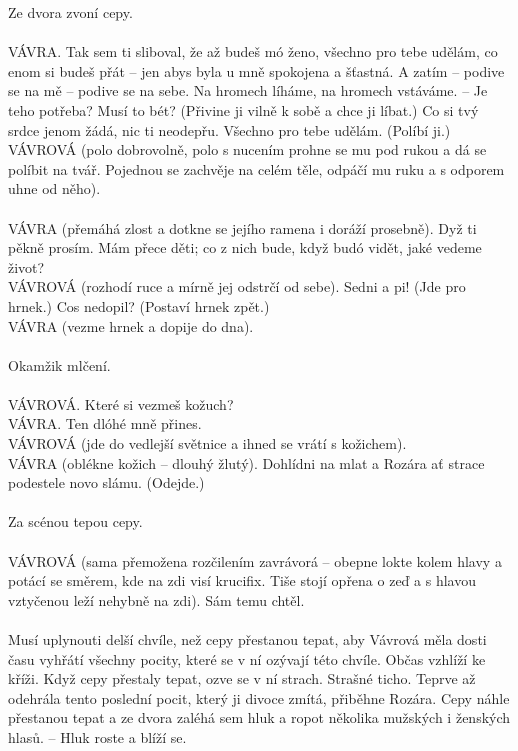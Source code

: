 \documentclass[10pt,a4paper]{article}
\begin{document}
Ze dvora zvoní cepy.\\
 \\
VÁVRA. Tak sem ti sliboval, že až budeš mó ženo, všechno pro tebe udělám, co enom si budeš přát – jen abys byla u mně spokojena a šťastná. A zatím – podive se na mě – podive se na sebe. Na hromech líháme, na hromech vstáváme. – Je teho potřeba? Musí to bét? (Přivine ji vilně k sobě a chce ji líbat.) Co si tvý srdce jenom žádá, nic ti neodepřu. Všechno pro tebe udělám. (Políbí ji.)\\
VÁVROVÁ (polo dobrovolně, polo s nucením prohne se mu pod rukou a dá se políbit na tvář. Pojednou se zachvěje na celém těle, odpáčí mu ruku a s odporem uhne od něho).\\
\\	
VÁVRA (přemáhá zlost a dotkne se jejího ramena i doráží prosebně). Dyž ti pěkně prosím. Mám přece děti; co z nich bude, když budó vidět, jaké vedeme život?\\
VÁVROVÁ (rozhodí ruce a mírně jej odstrčí od sebe). Sedni a pi! (Jde pro hrnek.) Cos nedopil? (Postaví hrnek zpět.) \\
VÁVRA (vezme hrnek a dopije do dna).\\
 \\
Okamžik mlčení.\\
 \\
VÁVROVÁ. Které si vezmeš kožuch?\\
VÁVRA. Ten dlóhé mně přines.\\
VÁVROVÁ (jde do vedlejší světnice a ihned se vrátí s kožichem).\\
VÁVRA (oblékne kožich – dlouhý žlutý). Dohlídni na mlat a Rozára ať strace podestele novo slámu. (Odejde.)\\
 \\
Za scénou tepou cepy.\\
 \\
VÁVROVÁ (sama přemožena rozčilením zavrávorá – obepne lokte kolem hlavy a potácí se směrem, kde na zdi visí krucifix. Tiše stojí opřena o zeď a s hlavou vztyčenou leží nehybně na zdi). Sám temu chtěl.\\
  \\
Musí uplynouti delší chvíle, než cepy přestanou tepat, aby Vávrová měla dosti času vyhřátí všechny pocity, které se v ní ozývají této chvíle. Občas vzhlíží ke kříži. Když cepy přestaly tepat, ozve se v ní strach. Strašné ticho. Teprve až odehrála tento poslední pocit, který ji divoce zmítá, přiběhne Rozára. Cepy náhle přestanou tepat a ze dvora zaléhá sem hluk a ropot několika mužských i ženských hlasů. – Hluk roste a blíží se.\\
\\
\restoregeometry
\end{document}

